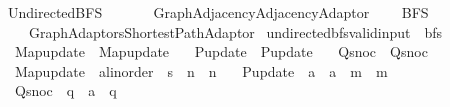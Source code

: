 %
\begin{isabellebody}%
%
%
\isadelimtheory
%
\endisadelimtheory
%
\isatagtheory
{}\isamarkupfalse%
\ Undirected{\isacharunderscore}{\kern0pt}BFS\isanewline
\ \ \isanewline
\ \ \ \ {\isachardoublequoteopen}{\isachardot}{\kern0pt}{\isachardot}{\kern0pt}{\isacharslash}{\kern0pt}Graph{\isacharslash}{\kern0pt}Adjacency{\isacharslash}{\kern0pt}Adjacency{\isacharunderscore}{\kern0pt}Adaptor{\isachardoublequoteclose}\isanewline
\ \ \ \ BFS\isanewline
\ \ \ \ {\isachardoublequoteopen}{\isachardot}{\kern0pt}{\isachardot}{\kern0pt}{\isacharslash}{\kern0pt}Graph{\isacharslash}{\kern0pt}Adaptors{\isacharslash}{\kern0pt}Shortest{\isacharunderscore}{\kern0pt}Path{\isacharunderscore}{\kern0pt}Adaptor{\isachardoublequoteclose}\isanewline
{}%
\endisatagtheory
{\isafoldtheory}%
%
\isadelimtheory
%
\endisadelimtheory
%
\isadelimdocument
%
\endisadelimdocument
%
\isatagdocument
%
\isamarkuptrue%
%
\endisatagdocument
{\isafolddocument}%
%
\isadelimdocument
%
\endisadelimdocument
{}\isamarkupfalse%
\ undirected{\isacharunderscore}{\kern0pt}bfs{\isacharunderscore}{\kern0pt}valid{\isacharunderscore}{\kern0pt}input\ {\isacharequal}{\kern0pt}\ bfs\ \isanewline
\ \ Map{\isacharunderscore}{\kern0pt}update\ {\isacharequal}{\kern0pt}\ Map{\isacharunderscore}{\kern0pt}update\ \isanewline
\ \ P{\isacharunderscore}{\kern0pt}update\ {\isacharequal}{\kern0pt}\ P{\isacharunderscore}{\kern0pt}update\ \isanewline
\ \ Q{\isacharunderscore}{\kern0pt}snoc\ {\isacharequal}{\kern0pt}\ Q{\isacharunderscore}{\kern0pt}snoc\ \isanewline
\ \ Map{\isacharunderscore}{\kern0pt}update\ {\isacharcolon}{\kern0pt}{\isacharcolon}{\kern0pt}\ {\isachardoublequoteopen}{\isacharprime}{\kern0pt}a{\isacharcolon}{\kern0pt}{\isacharcolon}{\kern0pt}linorder\ {\isasymRightarrow}\ {\isacharprime}{\kern0pt}s\ {\isasymRightarrow}\ {\isacharprime}{\kern0pt}n\ {\isasymRightarrow}\ {\isacharprime}{\kern0pt}n{\isachardoublequoteclose}\ \isanewline
\ \ P{\isacharunderscore}{\kern0pt}update\ {\isacharcolon}{\kern0pt}{\isacharcolon}{\kern0pt}\ {\isachardoublequoteopen}{\isacharprime}{\kern0pt}a\ {\isasymRightarrow}\ {\isacharprime}{\kern0pt}a\ {\isasymRightarrow}\ {\isacharprime}{\kern0pt}m\ {\isasymRightarrow}\ {\isacharprime}{\kern0pt}m{\isachardoublequoteclose}\ \isanewline
\ \ Q{\isacharunderscore}{\kern0pt}snoc\ {\isacharcolon}{\kern0pt}{\isacharcolon}{\kern0pt}\ {\isachardoublequoteopen}{\isacharprime}{\kern0pt}q\ {\isasymRightarrow}\ {\isacharprime}{\kern0pt}a\ {\isasymRightarrow}\ {\isacharprime}{\kern0pt}q{\isachardoublequoteclose}\ {\isacharplus}{\kern0pt}\isanewline

\end{isabellebody}
